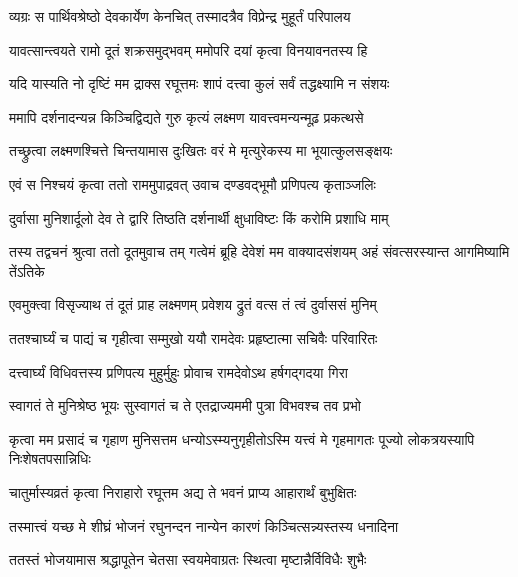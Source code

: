 
\twolineshloka
{व्यग्रः स पार्थिवश्रेष्ठो देवकार्येण केनचित्}
{तस्मादत्रैव विप्रेन्द्र मुहूर्तं परिपालय}%

\twolineshloka
{यावत्सान्त्वयते रामो दूतं शक्रसमुद्भवम्}
{ममोपरि दयां कृत्वा विनयावनतस्य हि}%


\twolineshloka
{यदि यास्यति नो दृष्टिं मम द्राक्स रघूत्तमः}
{शापं दत्त्वा कुलं सर्वं तद्धक्ष्यामि न संशयः}%

\twolineshloka
{ममापि दर्शनादन्यन्न किञ्चिद्विद्यते गुरु}
{कृत्यं लक्ष्मण यावत्त्वमन्यन्मूढ़ प्रकत्थसे}%

\twolineshloka
{तच्छ्रुत्वा लक्ष्मणश्चित्ते चिन्तयामास दुःखितः}
{वरं मे मृत्युरेकस्य मा भूयात्कुलसङ्क्षयः}%

\twolineshloka
{एवं स निश्चयं कृत्वा ततो राममुपाद्रवत्}
{उवाच दण्डवद्भूमौ प्रणिपत्य कृताञ्जलिः}%

\twolineshloka
{दुर्वासा मुनिशार्दूलो देव ते द्वारि तिष्ठति}
{दर्शनार्थी क्षुधाविष्टः किं करोमि प्रशाधि माम्}%

\threelineshloka
{तस्य तद्वचनं श्रुत्वा ततो दूतमुवाच तम्}
{गत्वेमं ब्रूहि देवेशं मम वाक्यादसंशयम्}
{अहं संवत्सरस्यान्त आगमिष्यामि तेंऽतिके}%

\twolineshloka
{एवमुक्त्वा विसृज्याथ तं दूतं प्राह लक्ष्मणम्}
{प्रवेशय द्रुतं वत्स तं त्वं दुर्वाससं मुनिम्}%

\twolineshloka
{ततश्चार्घ्यं च पाद्यं च गृहीत्वा सम्मुखो ययौ}
{रामदेवः प्रहृष्टात्मा सचिवैः परिवारितः}%

\twolineshloka
{दत्त्वार्घ्यं विधिवत्तस्य प्रणिपत्य मुहुर्मुहुः}
{प्रोवाच रामदेवोऽथ हर्षगद्गदया गिरा}%

\twolineshloka
{स्वागतं ते मुनिश्रेष्ठ भूयः सुस्वागतं च ते}
{एतद्राज्यममी पुत्रा विभवश्च तव प्रभो}%

\threelineshloka
{कृत्वा मम प्रसादं च गृहाण मुनिसत्तम}
{धन्योऽस्म्यनुगृहीतोऽस्मि यत्त्वं मे गृहमागतः}
{पूज्यो लोकत्रयस्यापि निःशेषतपसान्निधिः}%


\twolineshloka
{चातुर्मास्यव्रतं कृत्वा निराहारो रघूत्तम}
{अद्य ते भवनं प्राप्य आहारार्थं बुभुक्षितः}%

\twolineshloka
{तस्मात्त्वं यच्छ मे शीघ्रं भोजनं रघुनन्दन}
{नान्येन कारणं किञ्चित्सन्न्यस्तस्य धनादिना}%

\twolineshloka
{ततस्तं भोजयामास श्रद्धापूतेन चेतसा}
{स्वयमेवाग्रतः स्थित्वा मृष्टान्नैर्विविधैः शुभैः}%

